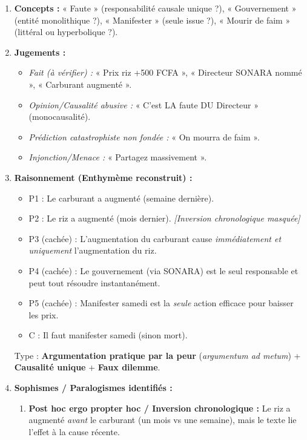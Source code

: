 \documentclass[11pt]{article}
\begin{document}
\begin{corrige}
\begin{enumerate}
    \item \textbf{Concepts :} « Faute » (responsabilité causale unique ?), « Gouvernement » (entité monolithique ?), « Manifester » (seule issue ?), « Mourir de faim » (littéral ou hyperbolique ?).
    \item \textbf{Jugements :}
    \begin{itemize}
        \item \textit{Fait (à vérifier) :} « Prix riz +500 FCFA », « Directeur SONARA nommé », « Carburant augmenté ».
        \item \textit{Opinion/Causalité abusive :} « C'est LA faute DU Directeur » (monocausalité).
        \item \textit{Prédiction catastrophiste non fondée :} « On mourra de faim ».
        \item \textit{Injonction/Menace :} « Partagez massivement ».
    \end{itemize}
    \item \textbf{Raisonnement (Enthymème reconstruit) :}
    \begin{itemize}
        \item P1 : Le carburant a augmenté (semaine dernière).
        \item P2 : Le riz a augmenté (mois dernier). \textit{[Inversion chronologique masquée]}
        \item P3 (cachée) : L'augmentation du carburant cause \emph{immédiatement et uniquement} l'augmentation du riz.
        \item P4 (cachée) : Le gouvernement (via SONARA) est le seul responsable et peut tout résoudre instantanément.
        \item P5 (cachée) : Manifester samedi est la \emph{seule} action efficace pour baisser les prix.
        \item C : Il faut manifester samedi (sinon mort).
    \end{itemize}
    Type : \textbf{Argumentation pratique par la peur} (\textit{argumentum ad metum}) + \textbf{Causalité unique} + \textbf{Faux dilemme}.
    \item \textbf{Sophismes / Paralogismes identifiés :}
    \begin{enumerate}
        \item \textbf{Post hoc ergo propter hoc / Inversion chronologique :} Le riz a augmenté \emph{avant} le carburant (un mois vs une semaine), mais le texte lie l'effet à la cause récente.

\end{enumerate}
\end{enumerate}
\end{corrige}
\end{document}
